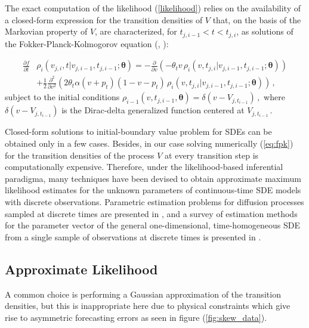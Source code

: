 \documentclass[11pt]{article}
\theoremstyle{definition}
\begin{document}
The exact computation of the likelihood (\ref{likelihood}) relies on the availability of a closed-form expression for the transition densities of $V$ that, on the basis of the Markovian property of $V$, are characterized, for $ t_{j, i-1} < t < t_{j,i}$,  as solutions of the Fokker-Planck-Kolmogorov equation (\cite[36]{iacus1}, \cite[61-68]{saso}):

\begin{align}
\frac{ \partial f }{\partial t } & \rho_i(v_{j,i} ,t \vert v_{j,i-1} ,  t_{j,i-1} ; \bm{\theta} )= - \frac{\partial}{ \partial v} (- \theta_t v \, \rho_i(v ,t_{j,i} \vert v_{j,i-1} ,  t_{j,i-1} ; \bm{\theta} ) ) \nonumber \\
& + \frac{1}{2} \frac{\partial^2}{ \partial v^2} ( 2 \theta_t \alpha (v+ p_t) (1 - v- p_t) \, \rho_i(v ,t_{j,i} \vert v_{j,i-1} ,  t_{j,i-1} ; \bm{\theta} ) )\,,  \label{eq:fpk}
\end{align}
subject to the initial conditions $\rho_{i-1}(v , t_{j, i-1} , \bm{\theta} ) = \delta(v - V_{j, t_{i-1}}) \,,$ where $ \delta(v - V_{j, t_{i-1}})$ is the Dirac-delta generalized function centered at $ V_{j, t_{i-1}}\,.$

Closed-form solutions to initial-boundary value problem for SDEs can be obtained only in a few cases. Besides, in our case solving numerically (\ref{eq:fpk}) for the transition densities of the process $V$ at every transition step is computationally expensive. 
Therefore, under the likelihood-based inferential paradigma, many techniques have been devised to obtain approximate maximum likelihood estimates for the unknown parameters of continuous-time SDE models with discrete observations. Parametric estimation problems for diffusion processes sampled at discrete times are presented in \autocite[Chapter 3]{iacus1}, and a survey of estimation methods for the parameter vector of the general one-dimensional, time-homogeneous SDE from a single sample of observations at discrete times is presented in \autocite{hurn}.

\subsection{Approximate Likelihood}


A common choice is performing a Gaussian approximation of the transition densities, but this is inappropriate here due to physical constraints which give rise to asymmetric forecasting errors as seen in figure (\ref{fig:skew_data}).\\
\end{document}

